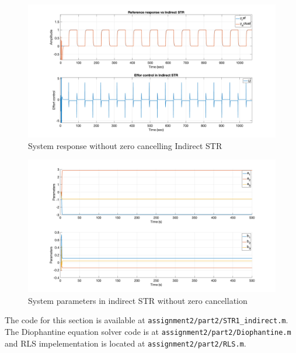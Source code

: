 \begin{figure}
	\centering
	\includegraphics[width=\textwidth]{images/str11.png}
	\caption{System response without zero cancelling Indirect STR }
	\label{fig:str11}
\end{figure}

\begin{figure}
	\centering
	\includegraphics[width=\textwidth]{images/str12.png}
	\caption{System parameters in indirect STR without zero cancellation}
	\label{fig:str12}
\end{figure}

The code for this section is available at \lstinline|assignment2/part2/STR1_indirect.m|.  The Diophantine equation solver code is at \lstinline|assignment2/part2/Diophantine.m| and RLS impelementation is located at \lstinline|assignment2/part2/RLS.m|.
